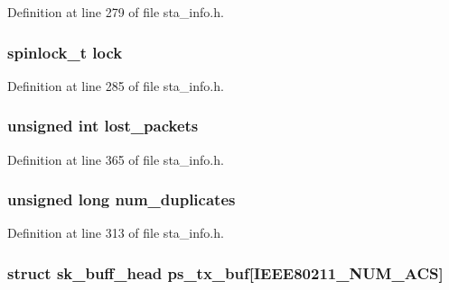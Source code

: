 Definition at line 279 of file sta\-\_\-info.\-h.

\hypertarget{structsta__info_a79cda015c79ff2b4c1444e3070f0bb5d}{
\subsubsection[{lock}]{\setlength{\rightskip}{0pt plus 5cm}spinlock\-\_\-t lock}}\label{structsta__info_a79cda015c79ff2b4c1444e3070f0bb5d}


Definition at line 285 of file sta\-\_\-info.\-h.

\hypertarget{structsta__info_ab7d0bdf10d99357afd115dd2c9926cb9}{
\subsubsection[{lost\-\_\-packets}]{\setlength{\rightskip}{0pt plus 5cm}unsigned int lost\-\_\-packets}}\label{structsta__info_ab7d0bdf10d99357afd115dd2c9926cb9}


Definition at line 365 of file sta\-\_\-info.\-h.

\hypertarget{structsta__info_a92103871c3849fc35afb2eefe76b249e}{
\subsubsection[{num\-\_\-duplicates}]{\setlength{\rightskip}{0pt plus 5cm}unsigned long num\-\_\-duplicates}}\label{structsta__info_a92103871c3849fc35afb2eefe76b249e}


Definition at line 313 of file sta\-\_\-info.\-h.

\hypertarget{structsta__info_af43dd904dd2c48899bae7cff072a56b5}{
\subsubsection[{ps\-\_\-tx\-\_\-buf}]{\setlength{\rightskip}{0pt plus 5cm}struct sk\-\_\-buff\-\_\-head ps\-\_\-tx\-\_\-buf\mbox{[}I\-E\-E\-E80211\-\_\-\-N\-U\-M\-\_\-\-A\-C\-S\mbox{]}}}\label{structsta__info_af43dd904dd2c48899bae7cff072a56b5}


